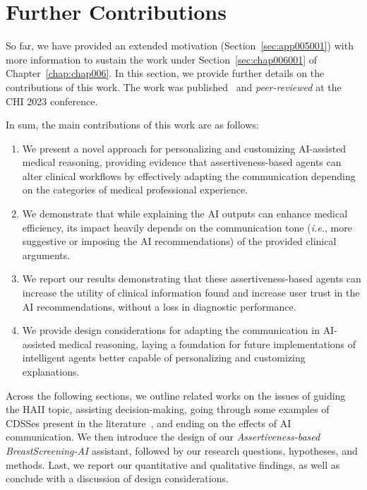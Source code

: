 \section{Further Contributions}
\label{sec:app005002}

So far, we have provided an extended motivation (Section~\ref{sec:app005001}) with more information to sustain the work under Section~\ref{sec:chap006001} of Chapter~\ref{chap:chap006}.
In this section, we provide further details on the contributions of this work.
The work was published~\cite{10.1145/3544548.3580682} and {\it peer-reviewed} at the \acs{CHI} 2023 conference.

\vspace{0.50mm}

\noindent
In sum, the main contributions of this work are as follows:

\vspace{0.05mm}

\begin{enumerate}
\item We present a novel approach for personalizing and customizing \ac{AI}-assisted medical reasoning, providing evidence that assertiveness-based agents can alter clinical workflows by effectively adapting the communication depending on the categories of medical professional experience.
\item We demonstrate that while explaining the \ac{AI} outputs can enhance medical efficiency, its impact heavily depends on the communication tone ({\it i.e.}, more suggestive or imposing the \ac{AI} recommendations) of the provided clinical arguments.
\item We report our results demonstrating that these assertiveness-based agents can increase the utility of clinical information found and increase user trust in the \ac{AI} recommendations, without a loss in diagnostic performance.
\item We provide design considerations for adapting the communication in \ac{AI}-assisted medical reasoning, laying a foundation for future implementations of intelligent agents better capable of personalizing and customizing explanations.
\end{enumerate}

\vspace{0.05mm}

Across the following sections, we outline related works on the issues of guiding the \ac{HAII} topic, assisting decision-making, going through some examples of \acp{CDSSe} present in the literature~\cite{NAISEH2023102941, 10.1145/3531146.3533193}, and ending on the effects of \ac{AI} communication.
We then introduce the design of our {\it Assertiveness-based BreastScreening-AI} assistant, followed by our research questions, hypotheses, and methods.
Last, we report our quantitative and qualitative findings, as well as conclude with a discussion of design considerations.

